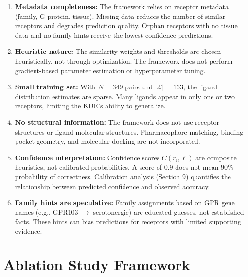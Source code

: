 \documentclass[12pt,oneside]{article}
\theoremstyle{definition}
\newcommand{\LL}{\mathcal{L}}
\begin{document}
\begin{enumerate}[label=(A\arabic*)]
\item \textbf{Metadata completeness:} The framework relies on receptor metadata (family, G-protein, tissue). Missing data reduces the number of similar receptors and degrades prediction quality. Orphan receptors with no tissue data and no family hints receive the lowest-confidence predictions.

\item \textbf{Heuristic nature:} The similarity weights and thresholds are chosen heuristically, not through optimization. The framework does not perform gradient-based parameter estimation or hyperparameter tuning.

\item \textbf{Small training set:} With $N = 349$ pairs and $|\LL| = 163$, the ligand distribution estimates are sparse. Many ligands appear in only one or two receptors, limiting the KDE's ability to generalize.

\item \textbf{No structural information:} The framework does not use receptor structures or ligand molecular structures. Pharmacophore matching, binding pocket geometry, and molecular docking are not incorporated.

\item \textbf{Confidence interpretation:} Confidence scores $C(r_i, \ell)$ are composite heuristics, not calibrated probabilities. A score of $0.9$ does not mean $90\%$ probability of correctness. Calibration analysis (Section 9) quantifies the relationship between predicted confidence and observed accuracy.

\item \textbf{Family hints are speculative:} Family assignments based on GPR gene names (e.g., GPR103 $\to$ serotonergic) are educated guesses, not established facts. These hints can bias predictions for receptors with limited supporting evidence.
\end{enumerate}

\section{Ablation Study Framework}
\end{document}

